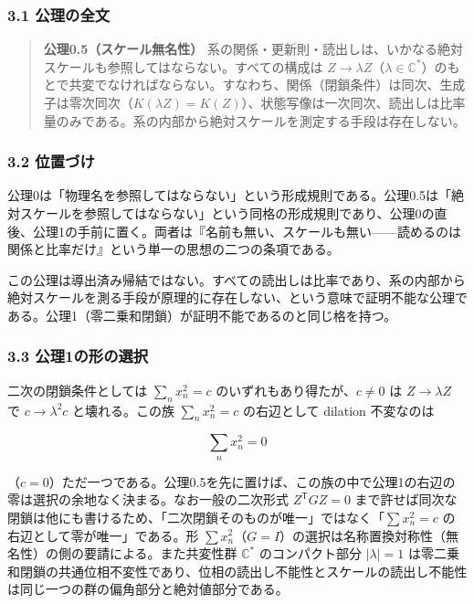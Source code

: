 \documentclass[
  a4paper,
]{ltjsarticle}
\begin{document}
\subsubsection{3.1 公理の全文}\label{ux516cux7406ux306eux5168ux6587}

\begin{quote}
\textbf{公理0.5（スケール無名性）}
系の関係・更新則・読出しは、いかなる絶対スケールも参照してはならない。すべての構成は
\(Z\to\lambda Z\)（\(\lambda\in\mathbb C^\ast\)）のもとで共変でなければならない。すなわち、関係（閉鎖条件）は同次、生成子は零次同次（\(K(\lambda Z)=K(Z)\)）、状態写像は一次同次、読出しは比率量のみである。系の内部から絶対スケールを測定する手段は存在しない。
\end{quote}

\subsubsection{3.2 位置づけ}\label{ux4f4dux7f6eux3065ux3051}

公理0は「物理名を参照してはならない」という形成規則である。公理0.5は「絶対スケールを参照してはならない」という同格の形成規則であり、公理0の直後、公理1の手前に置く。両者は『名前も無い、スケールも無い------読めるのは関係と比率だけ』という単一の思想の二つの条項である。

この公理は導出済み帰結ではない。すべての読出しは比率であり、系の内部から絶対スケールを測る手段が原理的に存在しない、という意味で証明不能な公理である。公理1（零二乗和閉鎖）が証明不能であるのと同じ格を持つ。

\subsubsection{3.3
公理1の形の選択}\label{ux516cux74061ux306eux5f62ux306eux9078ux629e}

二次の閉鎖条件としては \(\sum_n x_n^2=c\)
のいずれもあり得たが、\(c\ne0\) は \(Z\to\lambda Z\) で
\(c\to\lambda^2c\) と壊れる。この族 \(\sum_n x_n^2=c\) の右辺として
dilation 不変なのは

\[
\sum_n x_n^2=0
\]

（\(c=0\)）ただ一つである。公理0.5を先に置けば、この族の中で公理1の右辺の零は選択の余地なく決まる。なお一般の二次形式
\(Z^{\mathsf T}GZ=0\)
まで許せば同次な閉鎖は他にも書けるため、「二次閉鎖そのものが唯一」ではなく「\(\sum x_n^2=c\)
の右辺として零が唯一」である。形
\(\sum x_n^2\)（\(G=I\)）の選択は名称置換対称性（無名性）の側の要請による。また共変性群
\(\mathbb C^\ast\) のコンパクト部分 \(|\lambda|=1\)
は零二乗和閉鎖の共通位相不変性であり、位相の読出し不能性とスケールの読出し不能性は同じ一つの群の偏角部分と絶対値部分である。
\end{document}
